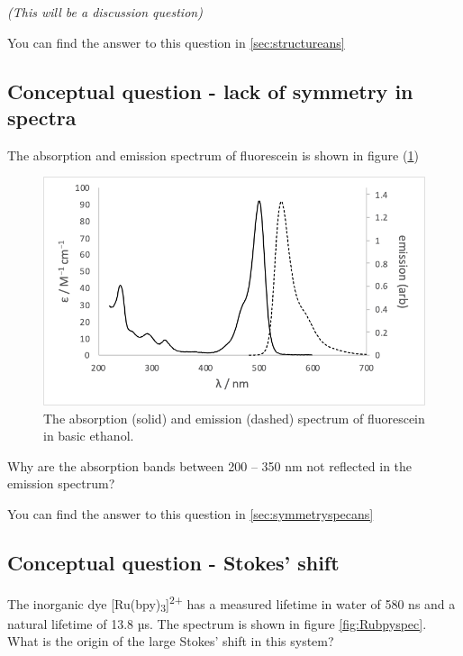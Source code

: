 \documentclass[
]{book}
\begin{document}
\emph{(This will be a discussion question)}

You can find the answer to this question in \ref{sec:structureans}

\hypertarget{sec:symmetryspec}{%
\subsection{Conceptual question - lack of symmetry in spectra}\label{sec:symmetryspec}}

The absorption and emission spectrum of fluorescein is shown in figure (\ref{fig:fluoresceinspec})

\begin{figure}

{\centering \includegraphics[width=0.7\linewidth]{images/fluoresceinspec} 

}

\caption{The absorption (solid) and emission (dashed) spectrum of fluorescein in basic ethanol.}\label{fig:fluoresceinspec}
\end{figure}

Why are the absorption bands between 200 -- 350 nm not reflected in the emission spectrum?

You can find the answer to this question in \ref{sec:symmetryspecans}

\hypertarget{sec:stokes}{%
\subsection{Conceptual question - Stokes' shift}\label{sec:stokes}}

The inorganic dye {[}Ru(bpy)\textsubscript{3}{]}\textsuperscript{2+} has a measured lifetime in water of 580 ns and a natural lifetime of 13.8 µs. The spectrum is shown in figure \ref{fig:Rubpyspec}. What is the origin of the large Stokes' shift in this system?
\end{document}
